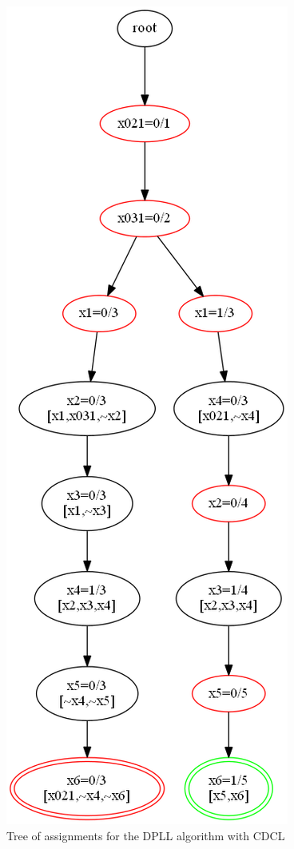 \documentclass[11pt]{article}
\begin{document}
\begin{figure}
\begin{center}
\includegraphics[keepaspectratio=true,height=.9\textheight]{tree2}
\end{center}
\caption{Tree of assignments for the DPLL algorithm with CDCL}\label{tree2}
\end{figure}
\end{document}
